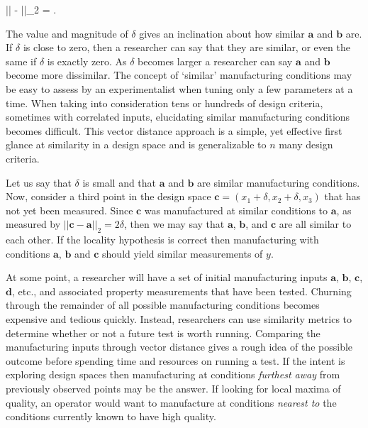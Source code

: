 \eqn
||  - ||_2 = \delta.
\equ




The value and magnitude of $\delta$ gives an inclination about how similar $\mathbf{a}$ and $\mathbf{b}$ are.
If $\delta$ is close to zero, then a researcher can say that they are similar, or even the same if $\delta$ is exactly zero.
As $\delta$ becomes larger a researcher can say $\mathbf{a}$ and $\mathbf{b}$ become more dissimilar.
The concept of `similar' manufacturing conditions may be easy to assess by an experimentalist when tuning only a few parameters at a time.
When taking into consideration tens or hundreds of design criteria, sometimes with correlated inputs, elucidating similar manufacturing conditions becomes difficult.
This vector distance approach is a simple, yet effective first glance at similarity in a design space and is generalizable to $n$ many design criteria.

Let us say that $\delta$ is small and that $\mathbf{a}$ and $\mathbf{b}$ are similar manufacturing conditions.
Now, consider a third point in the design space $\mathbf{c} = (x_{1} + \delta, x_2 + \delta, x_3)$ that has not yet been measured.
Since $\mathbf{c}$ was manufactured at similar conditions to $\mathbf{a}$, as measured by $||\mathbf{c} - \mathbf{a}||_2 = 2\delta$, then we may say that $\mathbf{a}$, $\mathbf{b}$, and $\mathbf{c}$ are all similar to each other. If the locality hypothesis is correct then manufacturing with conditions $\mathbf{a}$, $\mathbf{b}$ and $\mathbf{c}$ should yield similar measurements of $y$.

At some point, a researcher will have a set of initial manufacturing inputs $\mathbf{a}$, $\mathbf{b}$, $\mathbf{c}$, $\mathbf{d}$, etc., and associated property measurements that have been tested.
Churning through the remainder of all possible manufacturing conditions becomes expensive and tedious quickly.
Instead, researchers can use similarity metrics to determine whether or not a future test is worth running.
Comparing the manufacturing inputs through vector distance gives a rough idea of the possible outcome before spending time and resources on running a test.
If the intent is exploring design spaces then manufacturing at conditions \textit{furthest away} from previously observed points may be the answer.
If looking for local maxima of quality, an operator would want to manufacture at conditions \textit{nearest to} the conditions currently known to have high quality.

